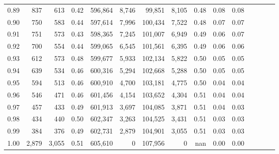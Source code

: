 \begin{tabular}{rrrcrrrrrrrrrrr}
0.89 &     837 &    613 &                                       0.42 &  596,864 &    8,746 &   99,851 &    8,105 &  0.48 &  0.08 &                         0.08 \\
0.90 &     750 &    583 &                                       0.44 &  597,614 &    7,996 &  100,434 &    7,522 &  0.48 &  0.07 &                         0.07 \\
0.91 &     751 &    573 &                                       0.43 &  598,365 &    7,245 &  101,007 &    6,949 &  0.49 &  0.06 &                         0.07 \\
0.92 &     700 &    554 &                                       0.44 &  599,065 &    6,545 &  101,561 &    6,395 &  0.49 &  0.06 &                         0.06 \\
0.93 &     612 &    573 &                                       0.48 &  599,677 &    5,933 &  102,134 &    5,822 &  0.50 &  0.05 &                         0.05 \\
0.94 &     639 &    534 &                                       0.46 &  600,316 &    5,294 &  102,668 &    5,288 &  0.50 &  0.05 &                         0.05 \\
0.95 &     594 &    513 &                                       0.46 &  600,910 &    4,700 &  103,181 &    4,775 &  0.50 &  0.04 &                         0.04 \\
0.96 &     546 &    471 &                                       0.46 &  601,456 &    4,154 &  103,652 &    4,304 &  0.51 &  0.04 &                         0.04 \\
0.97 &     457 &    433 &                                       0.49 &  601,913 &    3,697 &  104,085 &    3,871 &  0.51 &  0.04 &                         0.03 \\
0.98 &     434 &    440 &                                       0.50 &  602,347 &    3,263 &  104,525 &    3,431 &  0.51 &  0.03 &                         0.03 \\
0.99 &     384 &    376 &                                       0.49 &  602,731 &    2,879 &  104,901 &    3,055 &  0.51 &  0.03 &                         0.03 \\
1.00 &   2,879 &  3,055 &                                       0.51 &  605,610 &        0 &  107,956 &        0 &   nan &  0.00 &                         0.00 \\
\bottomrule
\end{tabular}
